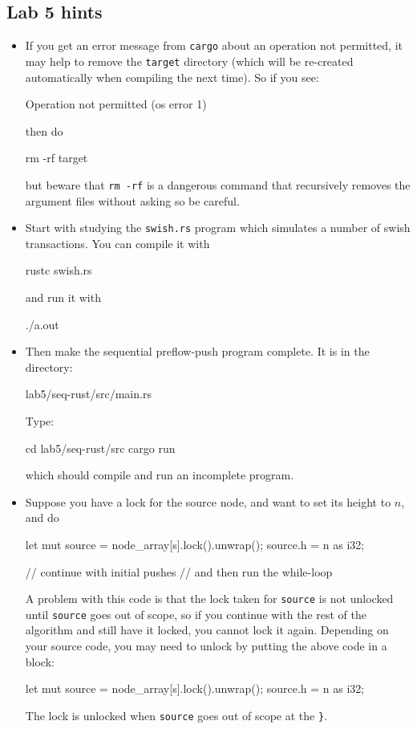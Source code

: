 \documentclass{forsete}
\begin{document}
{\subsection*{Lab 5 hints}
\begin{itemize}
\item If you get an error message from \verb.cargo. about an operation not permitted, it may help
to remove the \verb.target. directory (which will be re-created automatically when compiling the
next time). So if you see:
\begin{ccode}
Operation not permitted (os error 1)
\end{ccode}
then do
\begin{ccode}
rm -rf target
\end{ccode}
but beware that \verb.rm -rf. is a dangerous command that recursively removes the argument files without asking so be
careful.
\item Start with studying the \verb!swish.rs! program which simulates a number of swish transactions. 
You can compile it with
\begin{ccode}
rustc swish.rs
\end{ccode}
and run it with
\begin{ccode}
./a.out
\end{ccode}
\item Then make the sequential preflow-push program complete. It is in the directory:
\begin{ccode}
lab5/seq-rust/src/main.rs
\end{ccode}
Type:
\begin{ccode}
cd lab5/seq-rust/src
cargo run
\end{ccode}
which should compile and run an incomplete program.

\item Suppose you have a lock for the source node, and want to set its height to $n$, and do
\begin{ccode}
let mut source = node_array[s].lock().unwrap();
source.h = n as i32;

// continue with initial pushes
// and then run the while-loop
\end{ccode}
A problem with this code is that the lock taken for \verb.source. is not unlocked until
\verb.source. goes out of scope, so if you continue with the rest of the algorithm and
still have it locked, you cannot lock it again. Depending on your source code, you may
need to unlock by putting the above code in a block:
\begin{ccode}
{
	let mut source = node_array[s].lock().unwrap();
	source.h = n as i32;
}
\end{ccode}
The lock is unlocked when \verb.source. goes out of scope at the \verb.}..


\end{itemize}}
\end{document}
